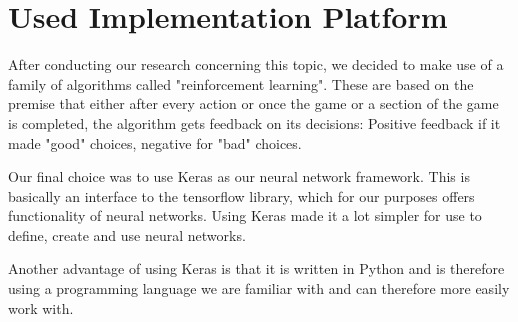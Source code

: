 \section{Used Implementation Platform}

After conducting our research concerning this topic, we decided to make use of a family of algorithms called "reinforcement learning". These are based on the premise that either after every action or once the game or a section of the game is completed, the algorithm gets feedback on its decisions: Positive feedback if it made "good" choices, negative for "bad" choices.

Our final choice was to use Keras as our neural network framework. This is basically an interface to the tensorflow library, which for our purposes offers functionality of neural networks. Using Keras made it a lot simpler for use to define, create and use neural networks.

Another advantage of using Keras is that it is written in Python and is therefore using a programming language we are familiar with and can therefore more easily work with.